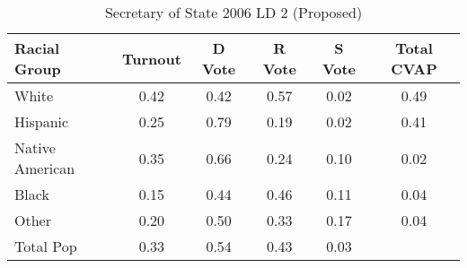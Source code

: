 \begin{table}[htb]
\begin{center}
\caption{Secretary of State 2006 LD 2 (Proposed)}
\label{sos06_cvap_ld_2}
\begin{tabular}{lccccc}
  \hline
Racial Group & Turnout & D Vote & R Vote & S Vote & Total CVAP \\ 
  \hline
White & 0.42 & 0.42 & 0.57 & 0.02 & 0.49 \\ 
  Hispanic & 0.25 & 0.79 & 0.19 & 0.02 & 0.41 \\ 
  Native American & 0.35 & 0.66 & 0.24 & 0.10 & 0.02 \\ 
  Black & 0.15 & 0.44 & 0.46 & 0.11 & 0.04 \\ 
  Other & 0.20 & 0.50 & 0.33 & 0.17 & 0.04 \\ 
  Total Pop & 0.33 & 0.54 & 0.43 & 0.03 &  \\ 
   \hline
\end{tabular}
\end{center}
\end{table}
